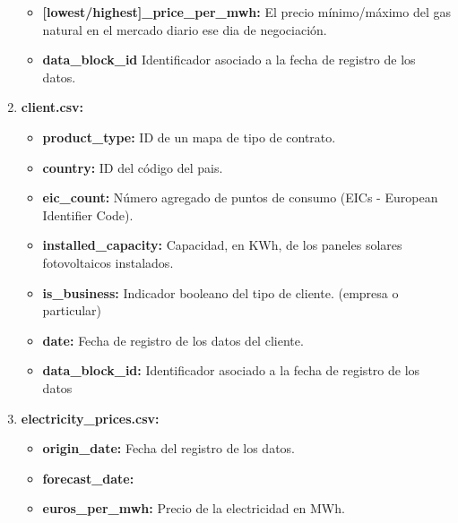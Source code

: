 \documentclass[a4paper,12pt]{article}
\begin{document}
\begin{enumerate}
\begin{itemize}
        \item \textbf{[lowest/highest]\_price\_per\_mwh:}
        El precio mínimo/máximo del gas natural en el 
        mercado diario ese dia de negociación.

        \item \textbf{data\_block\_id}
        Identificador asociado a la fecha de registro de los datos.

    \end{itemize}

    \item \textbf{client.csv:}
    \begin{itemize}
        \item \textbf{product\_type:}
        ID de un mapa de tipo de contrato.

        \item \textbf{country:}
        ID del código del pais.

        \item \textbf{eic\_count:}
        Número agregado de puntos de consumo
        (EICs - European Identifier Code).

        \item \textbf{installed\_capacity:}
        Capacidad, en KWh, de los paneles solares
        fotovoltaicos instalados.

        \item \textbf{is\_business:}
        Indicador booleano del tipo de cliente. (empresa 
        o particular)

        \item \textbf{date:}
        Fecha de registro de los datos del cliente.

        \item \textbf{data\_block\_id:}
        Identificador asociado a la fecha de registro de los datos

    \end{itemize}

    \item \textbf{electricity\_prices.csv:}
    \begin{itemize}
        \item \textbf{origin\_date:}
        Fecha del registro de los datos.

        \item \textbf{forecast\_date:}

        \item \textbf{euros\_per\_mwh:}
        Precio de la electricidad en MWh.


\end{itemize}
\end{enumerate}
\end{document}
